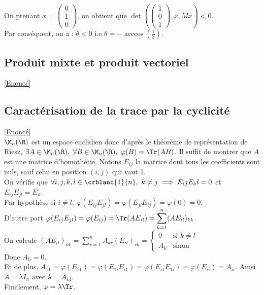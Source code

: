 \documentclass[8pt]{book}
\begin{document}
	On prenant $x=\begin{pmatrix}
		0\\1\\0
	\end{pmatrix}$, on obtient que $\det(\begin{pmatrix}
	1\\0\\1
	\end{pmatrix}, x, Mx)<0$.\\
	Par conséquent, on a : $\theta<0$ i.e $\theta=-\arccos\left(\frac{1}{3}\right)$.
	
	\subsection{Produit mixte et produit vectoriel}
	\label{Produit mixte et produit vectoriel corrigé}
	\textcolor{blue}{\hyperref[Produit mixte et produit vectoriel]{[Enoncé]}}\\
	
	\subsection{Caractérisation de la trace par la cyclicité }
	\label{Caractérisation de la trace par la cyclicité corrigé}
	\textcolor{blue}{\hyperref[Caractérisation de la trace par la cyclicité]{[Enoncé]}}\\
	$\M_n(\R)$ est un espace euclidien donc d'après le théorème de représentation de Riesz, $\exists A\in \M_n(\R),\ \forall B\in \M_n(\R),\ \varphi(B)=\Tr(AB)$. Il suffit de montrer que $A$ est une matrice d'homothétie. Notons $E_{ij}$ la matrice dont tous les coefficients sont nuls, sauf celui en position $(i,j)$ qui vaut 1.\\
	On vérifie que $\forall i,j,k,l\in \crblanc{1}{n},\ k\ne j\implies E_ijE_kl=0$ et $E_{ij}E_{jl}=E_{il}$.\\
	Par hypothèse si $i\ne l,\ \varphi(E_{ij}E_{jl})=\varphi(E_{jl}E_{ij})=\varphi(0)=0$.\\
	D'autre part $\varphi(E_{ij}E_{jl})=\varphi(E_{ij})=\Tr(AE_{il})=\displaystyle\sum_{k=1}^n(AE_{il})_{kk}$.\\
	On calcule $(AE_{il})_{kk}=\displaystyle\sum_{r=1}^nA_{kr}(E_{il})_{rk}=\begin{cases}
		0&\mbox{si }k\ne l\\
		A_{li}&\mbox{sinon}
	\end{cases}$\\
	Donc $A_{li}=0$.\\
	Et de plus, $A_{11}=\varphi(E_{11})=\varphi(E_{1i}E_{i1})=\varphi(E_{i1}E_{1i})=\varphi(E_{ii})=A_{ii}$. Ainsi $A=\lambda I_n$ avec $\lambda=A_{11}$.\\
	Finalement, $\varphi=\lambda\Tr$.\\\\
	
\end{document}
